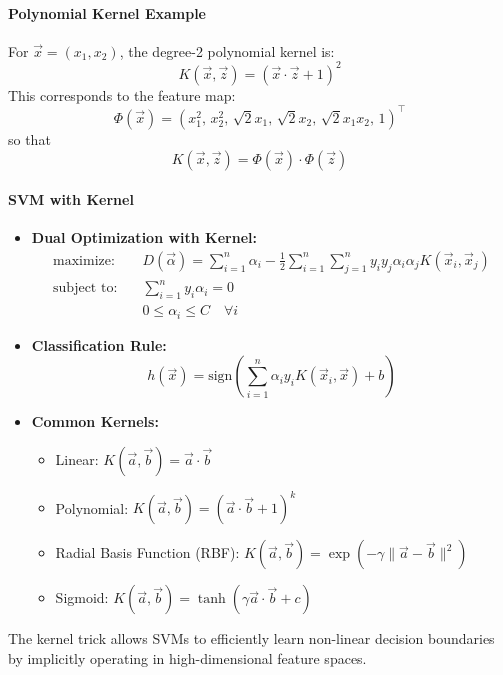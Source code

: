 \paragraph{Polynomial Kernel Example}

For $\vec{x} = (x_1, x_2)$, the degree-2 polynomial kernel is:
\[
    K(\vec{x}, \vec{z}) = (\vec{x} \cdot \vec{z} + 1)^2
\]
This corresponds to the feature map:
\[
    \Phi(\vec{x}) = (x_1^2,\, x_2^2,\, \sqrt{2}x_1,\, \sqrt{2}x_2,\, \sqrt{2}x_1x_2,\, 1)^\top
\]
so that
\[
    K(\vec{x}, \vec{z}) = \Phi(\vec{x}) \cdot \Phi(\vec{z})
\]

\paragraph{SVM with Kernel}

\begin{itemize}
    \item \textbf{Dual Optimization with Kernel:}
    \begin{align*}
        \text{maximize:} \quad & D(\vec{\alpha}) = \sum_{i=1}^n \alpha_i - \frac{1}{2} \sum_{i=1}^n \sum_{j=1}^n y_i y_j \alpha_i \alpha_j K(\vec{x}_i, \vec{x}_j) \\
        \text{subject to:} \quad & \sum_{i=1}^n y_i \alpha_i = 0 \\
        & 0 \leq \alpha_i \leq C \quad \forall i
    \end{align*}
    \item \textbf{Classification Rule:}
    \[
        h(\vec{x}) = \text{sign} \left( \sum_{i=1}^n \alpha_i y_i K(\vec{x}_i, \vec{x}) + b \right)
    \]
    \item \textbf{Common Kernels:}
    \begin{itemize}
        \item Linear: $K(\vec{a}, \vec{b}) = \vec{a} \cdot \vec{b}$
        \item Polynomial: $K(\vec{a}, \vec{b}) = (\vec{a} \cdot \vec{b} + 1)^k$
        \item Radial Basis Function (RBF): $K(\vec{a}, \vec{b}) = \exp\left(-\gamma \|\vec{a} - \vec{b}\|^2\right)$
        \item Sigmoid: $K(\vec{a}, \vec{b}) = \tanh(\gamma \vec{a} \cdot \vec{b} + c)$
    \end{itemize}
\end{itemize}

The kernel trick allows SVMs to efficiently learn non-linear decision boundaries by implicitly operating in high-dimensional feature spaces.

